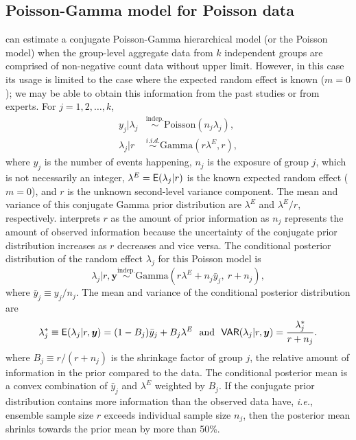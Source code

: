 \documentclass[article]{jss}
\begin{document}
\subsection[Poisson-Gamma]{Poisson-Gamma model for Poisson data}\label{poissonsubsec}
 can estimate a conjugate Poisson-Gamma hierarchical model (or the Poisson model) when the group-level aggregate data from $k$ independent  groups are comprised of non-negative count data without upper limit. However, in this case its usage is limited to the case where the expected random effect is known ($m=0$); we may be able to obtain this information from the past studies or from experts. For $j=1, 2, \ldots, k$, 
\begin{align}
y_j\vert \lambda_j &\stackrel{\textrm{indep.}}{\sim}  \textrm{Poisson}(n_{j}\lambda_{j}),\\
\lambda_{j}\vert r &\stackrel{i.i.d.}{\sim} \textrm{Gamma}(r\lambda^E, r),
\end{align}
where $y_j$ is the number of events happening, $n_{j}$ is the exposure of group $j$, which is not necessarily an integer, $\lambda^E=\mathsf{E}(\lambda_j\vert r)$ is the known expected random effect ($m=0$), and $r$ is the unknown second-level variance component. The mean and variance of this conjugate Gamma prior distribution are $\lambda^E$ and $\lambda^E/r$, respectively.  \cite{albert1988computational} interprets $r$ as the amount of prior information as $n_{j}$ represents the amount of observed information because the uncertainty of the conjugate prior distribution increases as $r$ decreases and vice versa. The conditional posterior distribution of the random effect $\lambda_j$ for this Poisson model is
\begin{equation} \label{gammapost}
\lambda_j\vert r, \boldsymbol{y} \stackrel{\textrm{indep.}}{\sim}\textrm{Gamma}(r\lambda^E + n_j\bar{y}_{j},~ r + n_j),
\end{equation}  
where $\bar{y}_j\equiv y_j/n_j$. The mean and variance of the conditional posterior distribution are
\begin{equation}\label{gammapost_mean_var}
\lambda^\ast_j\equiv \mathsf{E}(\lambda_j\vert r, \boldsymbol{y} )=(1-B_{j})\bar{y}_{j} + B_{j}\lambda^E~~\textrm{and}~~\mathsf{VAR}(\lambda_j\vert r, \boldsymbol{y})=\frac{\lambda^\ast_j}{r+n_j}.
\end{equation}
where $B_{j}\equiv r / (r+n_{j})$ is the shrinkage factor of group $j$, the relative amount of information in the prior compared to the data. The conditional posterior mean is  a convex combination of $\bar{y}_{j}$ and  $\lambda^E$ weighted by $B_j$. If the conjugate prior distribution contains more information than the observed data have, \emph{i.e.}, ensemble sample size $r$ exceeds individual sample size $n_{j}$, then the posterior mean shrinks  towards the prior mean by more than 50\%.%
\end{document}
